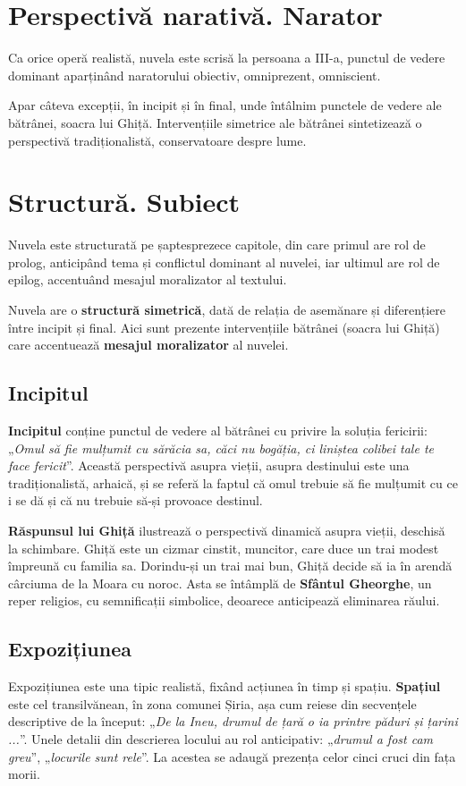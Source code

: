 \documentclass{article}
\newcommand{\qu}[1]{„\emph{#1}”}
\begin{document}
\section{Perspectivă narativă. Narator}
Ca orice operă realistă, nuvela este scrisă la persoana a III-a, punctul de vedere dominant aparținând naratorului obiectiv, omniprezent, omniscient.

Apar câteva excepții, în incipit și în final, unde întâlnim punctele de vedere ale bătrânei, soacra lui Ghiță. Intervențiile simetrice ale bătrânei sintetizează o perspectivă tradiționalistă, conservatoare despre lume.
\section{Structură. Subiect}
Nuvela este structurată pe șaptesprezece capitole, din care primul are rol de prolog, anticipând tema și conflictul dominant al nuvelei, iar ultimul are rol de epilog, accentuând mesajul moralizator al textului.

Nuvela are o \textbf{structură simetrică}, dată de relația de asemănare și diferențiere între incipit și final. Aici sunt prezente intervențiile bătrânei (soacra lui Ghiță) care accentuează \textbf{mesajul moralizator} al nuvelei.

\subsection{Incipitul}
\textbf{Incipitul} conține punctul de vedere al bătrânei cu privire la soluția fericirii: \qu{Omul să fie mulțumit cu sărăcia sa, căci nu bogăția, ci liniștea colibei tale te face fericit}. Această perspectivă asupra vieții, asupra destinului este una tradiționalistă, arhaică, și se referă la faptul că omul trebuie să fie mulțumit cu ce i se dă și că nu trebuie să-și provoace destinul.

\textbf{Răspunsul lui Ghiță} ilustrează o perspectivă dinamică asupra vieții, deschisă la schimbare. Ghiță este un cizmar cinstit, muncitor, care duce un trai modest împreună cu familia sa. Dorindu-și un trai mai bun, Ghiță decide să ia în arendă cârciuma de la Moara cu noroc. Asta se întâmplă de \textbf{Sfântul Gheorghe}, un reper religios, cu semnificații simbolice, deoarece anticipează eliminarea răului.

\subsection{Expozițiunea}
Expozițiunea este una tipic realistă, fixând acțiunea în timp și spațiu. \textbf{Spațiul} este cel transilvănean, în zona comunei Șiria, așa cum reiese din secvențele descriptive de la început: \qu{De la Ineu, drumul de țară o ia printre păduri și țarini ...}. Unele detalii din descrierea locului au rol anticipativ: \qu{drumul a fost cam greu}, \qu{locurile sunt rele}. La acestea se adaugă prezența celor cinci cruci din fața morii.
\end{document}
